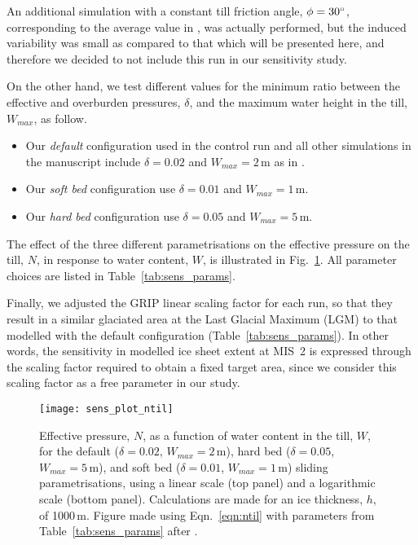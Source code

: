 An additional simulation with a constant till friction angle, $\phi=30^{\circ}$,
corresponding to the average value in \citet[p.~268]{Cuffey.Paterson.2010}, was
actually performed, but the induced variability was small as compared to that
which will be presented here, and therefore we decided to not include this run
in our sensitivity study.

On the other hand, we test different values for the minimum ratio between the
effective and overburden pressures, $\delta$, and the maximum water
height in the till, $W_{max}$, as follow.

\begin{itemize}
    \item{Our \emph{default} configuration used in the control run and all other
          simulations in the manuscript include $\delta=0.02$ and
          $W_{max}=2$\,m as in \citet{Bueler.Pelt.2015}.}
    \item{Our \emph{soft bed} configuration use $\delta=0.01$ and
          $W_{max}=1$\,m.}
    \item{Our \emph{hard bed} configuration use $\delta=0.05$ and
          $W_{max}=5$\,m.}
\end{itemize}

The effect of the three different parametrisations on the effective pressure on
the till, $N$, in response to water content, $W$, is illustrated in
Fig.~\ref{fig:sens_plot_ntil}.
All parameter choices are listed in Table~\ref{tab:sens_params}.

Finally, we adjusted the GRIP linear scaling factor for each run, so that they
result in a similar glaciated area at the Last Glacial Maximum (LGM) to that
modelled with the default configuration (Table~\ref{tab:sens_params}).
In other words, the sensitivity in modelled ice sheet extent at MIS~2 is
expressed through the scaling factor required to obtain a fixed target area,
since we consider this scaling factor as a free parameter in our study.

\begin{figure}
    \centering
    \texttt{[image: sens\_plot\_ntil]}
    \caption{Effective pressure, $N$, as a function of water content in the
             till, $W$, for the default ($\delta=0.02$, $W_{max}=2$\,m),
             hard bed ($\delta=0.05$, $W_{max}=5$\,m), and soft bed
             ($\delta=0.01$, $W_{max}=1$\,m) sliding parametrisations, using a
             linear scale (top panel) and a logarithmic scale (bottom panel).
             Calculations are made for an ice thickness, $h$, of 1000\,m.
             Figure made using Eqn.~\ref{eqn:ntil} with parameters from
             Table~\ref{tab:sens_params} after
             \citet[Fig.~1]{Bueler.Pelt.2015}.}
    \label{fig:sens_plot_ntil}
\end{figure}

